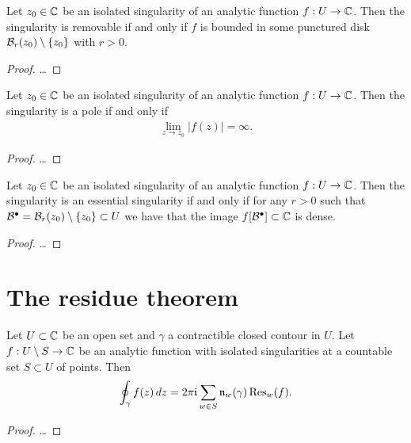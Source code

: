 \begin{theorem}
  \label{thm:removable_singularity}
  Let $z_0 \in \mathbb{C}$ be an isolated singularity of
  an analytic function $f : U \to \mathbb{C}$.
  Then the singularity is removable if and only if
  $f$ is bounded in some punctured disk $\mathcal{B}_{r}(z_0) \setminus \{z_0\}$
  with $r>0$.
\end{theorem}
\begin{proof}
  \ldots
\end{proof}

\begin{theorem}
  \label{thm:pole}
  Let $z_0 \in \mathbb{C}$ be an isolated singularity of
  an analytic function $f : U \to \mathbb{C}$.
  Then the singularity is a pole if and only if
  \begin{align*}
    \lim_{z \to z_0} | f(z) | = \infty .
  \end{align*}
\end{theorem}
\begin{proof}
  \ldots
\end{proof}

\begin{theorem}
  \label{thm:essential_singularity}
  Let $z_0 \in \mathbb{C}$ be an isolated singularity of
  an analytic function $f : U \to \mathbb{C}$.
  Then the singularity is an essential singularity if and only if
  for any $r>0$ such that $\mathcal{B}^\bullet = \mathcal{B}_{r}(z_0) \setminus \{z_0\} \subset U$
  we have that the image $f[\mathcal{B}^\bullet] \subset \mathbb{C}$ is dense.
\end{theorem}
\begin{proof}
  \ldots
\end{proof}



\section{The residue theorem}

\begin{theorem}
  \label{thm:residue_theorem}
  Let $U \subset \mathbb{C}$ be an open set and $\gamma$ a contractible closed contour in $U$.
  Let $f : U \setminus S \to \mathbb{C}$ be an analytic function with isolated
  singularities at a countable set $S \subset U$ of points.
  Then
  \begin{align*}
    \oint_\gamma f(z) \, dz
      = 2 \pi \mathfrak{i} \sum_{w \in S} \mathfrak{n}_{{w}}(\gamma) \, \mathrm{Res}_{{w}}({f}) .
  \end{align*}
\end{theorem}
\begin{proof}
  \ldots
\end{proof}

